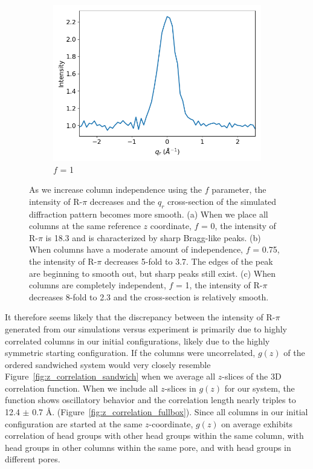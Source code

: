 \documentclass[journal=jpcbfk,manuscript=article]{achemso}
\begin{document}
\begin{figure}
\begin{subfigure}{0.3\textwidth}
  \includegraphics[width=\textwidth]{sf_qy_sr100.png}
  \caption{$f$ = 1}\label{fig:sf_qy_sr100}
  \end{subfigure}
  \caption{As we increase column independence using the $f$ parameter, the
	  intensity of R-$\pi$ decreases and the $q_r$ cross-section of the simulated
	  diffraction pattern becomes more smooth.  (a) When we place all columns at the
	  same reference $z$ coordinate, $f$ = 0, the intensity of R-$\pi$ is 18.3 and is
	  characterized by sharp Bragg-like peaks. (b) When columns have a moderate
	  amount of independence, $f$ = 0.75, the intensity of R-$\pi$ decreases 5-fold
	  to 3.7. The edges of the peak are beginning to smooth out, but sharp peaks
	  still exist. (c) When columns are completely independent, $f$ = 1, the
	  intensity of R-$\pi$ decreases 8-fold to 2.3 and the cross-section is
          relatively smooth.}\label{fig:column_displacement}
  \end{figure}

  It therefore seems likely that the discrepancy between the intensity of
  R-$\pi$ generated from our simulations versus experiment is primarily due to
  highly correlated columns in our initial configurations, likely due to the
  highly symmetric starting configuration. If the columns were uncorrelated,
  $g(z)$ of the ordered sandwiched system would very closely resemble
  Figure~\ref{fig:z_correlation_sandwich} when we average all $z$-slices of the
  3D correlation function. When we include all $z$-slices in $g(z)$ for our
  system, the function shows oscillatory behavior and the correlation length
  nearly triples to 12.4 $\pm$ 0.7 \AA. (Figure~\ref{fig:z_correlation_fullbox}).
  Since all columns in our initial configuration are started at the same
  $z$-coordinate, $g(z)$ on average exhibits correlation of head groups with
  other head groups within the same column, with head groups in other columns
  within the same pore, and with head groups in different pores.
\end{document}
